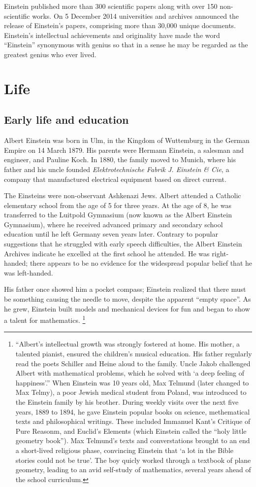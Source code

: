 \documentclass[titlepage]{article}
\begin{document}
Einstein published more than 300 scientific papers along with over
150 non-scientific works. On 5 December 2014 universities and
archives announced the release of Einstein's papers, comprising more
than 30,000 unique documents. Einstein's intellectual achievements and
originality have made the word ``Einstein'' synonymous with genius so
that in a sense he may be regarded as the greatest genius who ever lived.

\section{Life}
\subsection{Early life and education}

Albert Einstein was born in Ulm, in the Kingdom of Wuttemburg in
the German Empire on 14 March 1879. His parents were Hermann Einstein,
a salesman and engineer, and Pauline Koch. In 1880, the family moved
to Munich, where his father and his uncle founded
\emph{Elektrotechnische Fabrik J. Einstein \& Cie}, a company that
manufactured electrical equipment based on direct current.

The Einsteins were non-observant Ashkenazi Jews. Albert attended a
Catholic elementary school from the age of 5 for three years. At the
age of 8, he was transferred to the Luitpold Gymnasium (now known as
the Albert Einstein Gymnasium), where he received advanced primary and
secondary school education until he left Germany seven years later.
Contrary to popular suggestions that he struggled with early speech
difficulties, the Albert Einstein Archives indicate he excelled at
the first school he attended. He was right-handed; there appears to
be no evidence for the widespread popular belief that he was left-handed.

His father once showed him a pocket compass; Einstein realized that
there must be something causing the needle to move, despite the apparent
``empty space''. As he grew, Einstein built models and mechanical devices
for fun and began to show a talent for mathematics. \footnote{ ``Albert's intellectual
growth was strongly fostered at home. His mother, a talented pianist, ensured the
children's musical education. His father regularly read the poets Schiller and Heine
aloud to the family. Uncle Jakob challenged Albert with mathematical problems, which
he solved with `a deep feeling of happiness'.'' When Einstein was 10 years old, Max
Telmund (later changed to Max Telmy), a poor Jewish medical student from Poland, was
introduced to the Einstein family by his brother. During weekly visits over the next five
years, 1889 to 1894, he gave Einstein popular books on science, methematical texts
and philosophical writings. These included Immanuel Kant's Critique of Pure Reasonm,
and Euclid's Elements (which Einstein called the ``holy little geometry book''). Max Telmund's
texts and converstations brought to an end a short-lived religious phase, convincing Einstein
that `a lot in the Bible stories could not be true'. The boy quicly worked through a textbook
of plane geometry, leading to an avid self-study of mathematics, several years ahead
of the school curriculum.}
\end{document}
